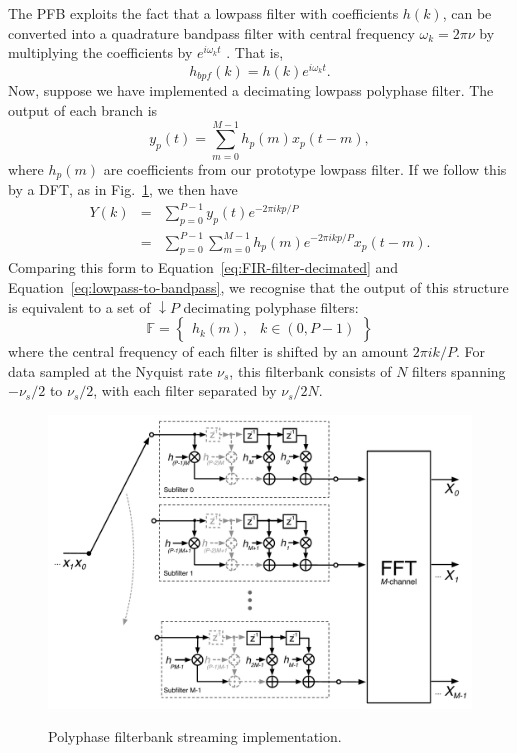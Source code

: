 \documentclass{ws-rv961x669}
\begin{document}
The PFB exploits the fact that a lowpass filter with coefficients $h(k)$, can be converted into a quadrature bandpass filter with central frequency $\omega_{k}=2\pi\nu$ by multiplying the coefficients by $e^{i\omega_{k}t}$ . That is, 
\begin{equation}
h_{bpf}(k)=h(k)e^{i\omega_{k}t}.\label{eq:lowpass-to-bandpass}
\end{equation}
Now, suppose we have implemented a decimating lowpass polyphase filter. The output of each branch is 
\begin{equation}
y_{p}(t)=\sum_{m=0}^{M-1}h_{p}(m)x_{p}(t-m),
\end{equation}
where $h_{p}(m)$ are coefficients from our prototype lowpass filter. If we follow this by a DFT, as in Fig.~\ref{fig:pfb_fir_fft}, we then have 
\begin{eqnarray}
Y(k) & = & \sum_{p=0}^{P-1}y_{p}(t)e^{-2\pi ikp/P}\\
 & = & \sum_{p=0}^{P-1}\sum_{m=0}^{M-1}h_{p}(m)e^{-2\pi ikp/P}x_{p}(t-m).
\end{eqnarray}
Comparing this form to Equation~\ref{eq:FIR-filter-decimated} and Equation~\ref{eq:lowpass-to-bandpass}, we recognise that the output
of this structure is equivalent to a set of $\downarrow P$ decimating polyphase filters:
\begin{equation}
\mathbb{F}=\begin{Bmatrix}h_{k}(m), & k\in(0,P-1)\end{Bmatrix}
\end{equation}
where the central frequency of each filter is shifted by an amount $\mbox{2}\pi ik/P$. For data sampled at the Nyquist rate $\nu_{s}$,
this filterbank consists of $N$ filters spanning $-\nu_{s}/\mbox{2}$ to $\nu_{s}/\mbox{2}$, with each filter separated by $\nu_{s}/\mbox{2}N$.

\begin{figure}
 \centering
 \includegraphics[width=\textwidth]{./figures/pfb_fir_fft}
 \label{fig:pfb_fir_fft}
 \caption{Polyphase filterbank streaming implementation.}
\end{figure}
\end{document}
